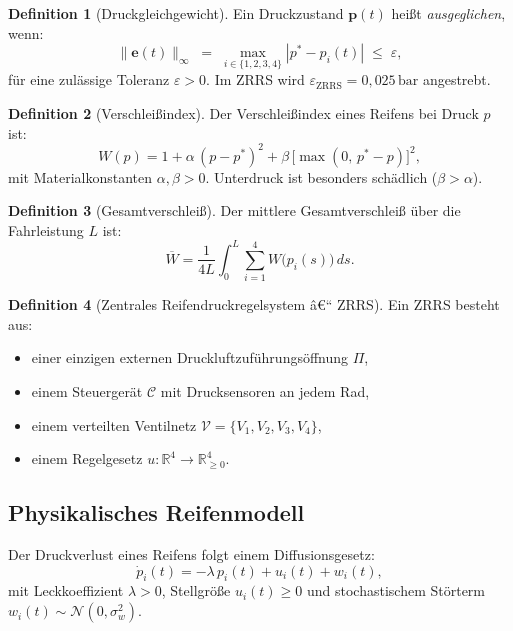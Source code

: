 ﻿\documentclass[a4paper,12pt]{article}
\theoremstyle{definition}
\newtheorem{definition}{Definition}
\begin{document}
\begin{definition}[Druckgleichgewicht]
Ein Druckzustand $\mathbf{p}(t)$ heißt \emph{ausgeglichen}, wenn:
\[
    \|\mathbf{e}(t)\|_\infty \;=\; \max_{i \in \{1,2,3,4\}} |p^* - p_i(t)|
    \;\leq\; \varepsilon,
\]
für eine zulässige Toleranz $\varepsilon > 0$. Im ZRRS wird
$\varepsilon_{\text{ZRRS}} = 0{,}025\,\text{bar}$ angestrebt.
\end{definition}

\begin{definition}[Verschleißindex]
Der Verschleißindex eines Reifens bei Druck $p$ ist:
\[
    W(p) = 1 + \alpha\,(p - p^*)^2 + \beta\,\bigl[\max(0,\, p^* - p)\bigr]^2,
\]
mit Materialkonstanten $\alpha, \beta > 0$. Unterdruck ist besonders
schädlich ($\beta > \alpha$).
\end{definition}

\begin{definition}[Gesamtverschleiß]
Der mittlere Gesamtverschleiß über die Fahrleistung $L$ ist:
\[
    \overline{W} = \frac{1}{4L} \int_0^L \sum_{i=1}^{4} W\bigl(p_i(s)\bigr)\, ds.
\]
\end{definition}

\begin{definition}[Zentrales Reifendruckregelsystem â€“ ZRRS]
Ein ZRRS besteht aus:
\begin{itemize}
    \item einer einzigen externen Druckluftzuführungsöffnung $\Pi$,
    \item einem Steuergerät $\mathcal{C}$ mit Drucksensoren an jedem Rad,
    \item einem verteilten Ventilnetz $\mathcal{V} = \{V_1, V_2, V_3, V_4\}$,
    \item einem Regelgesetz $u: \mathbb{R}^4 \to \mathbb{R}_{\geq 0}^4$.
\end{itemize}
\end{definition}

\subsection{Physikalisches Reifenmodell}

Der Druckverlust eines Reifens folgt einem Diffusionsgesetz:
\[
    \dot{p}_i(t) = -\lambda\, p_i(t) + u_i(t) + w_i(t),
\]
mit Leckkoeffizient $\lambda > 0$, Stellgröße $u_i(t) \geq 0$ und
stochastischem Störterm $w_i(t) \sim \mathcal{N}(0, \sigma_w^2)$.

\end{document}
